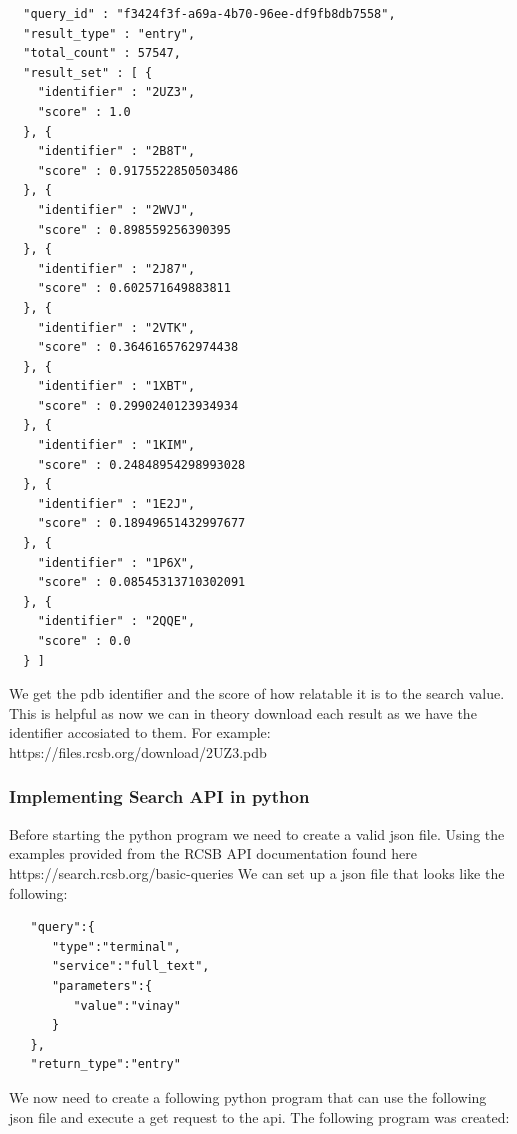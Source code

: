 \documentclass[]{final_report}
\begin{document}
\begin{lstlisting}
  "query_id" : "f3424f3f-a69a-4b70-96ee-df9fb8db7558",
  "result_type" : "entry",
  "total_count" : 57547,
  "result_set" : [ {
    "identifier" : "2UZ3",
    "score" : 1.0
  }, {
    "identifier" : "2B8T",
    "score" : 0.9175522850503486
  }, {
    "identifier" : "2WVJ",
    "score" : 0.898559256390395
  }, {
    "identifier" : "2J87",
    "score" : 0.602571649883811
  }, {
    "identifier" : "2VTK",
    "score" : 0.3646165762974438
  }, {
    "identifier" : "1XBT",
    "score" : 0.2990240123934934
  }, {
    "identifier" : "1KIM",
    "score" : 0.24848954298993028
  }, {
    "identifier" : "1E2J",
    "score" : 0.18949651432997677
  }, {
    "identifier" : "1P6X",
    "score" : 0.08545313710302091
  }, {
    "identifier" : "2QQE",
    "score" : 0.0
  } ]
\end{lstlisting}

We get the pdb identifier and the score of how relatable it is to the search value. This is helpful as now we can in theory download each result as we have the identifier accosiated to them. For example: https://files.rcsb.org/download/2UZ3.pdb

\subsubsection{Implementing Search API in python}

Before starting the python program we need to create a valid json file. Using the examples provided from the RCSB API documentation found here https://search.rcsb.org/basic-queries We can set up a json file that looks like the following:

\begin{lstlisting}
   "query":{
      "type":"terminal",
      "service":"full_text",
      "parameters":{
         "value":"vinay"
      }
   },
   "return_type":"entry"
\end{lstlisting}

We now need to create a following python program that can use the following json file and execute a get request to the api. The following program was created: 
\end{document}
